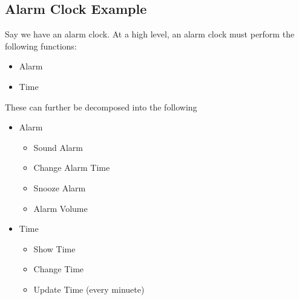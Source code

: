\documentclass[12pt,a4paper]{book}
\begin{document}
			\subsection{Alarm Clock Example}
				Say we have an alarm clock. At a high level, an alarm clock must perform the following functions:
				\begin{itemize}
					\item Alarm
					\item Time
				\end{itemize}

				These can further be decomposed into the following
				
				\begin{itemize}
					\item Alarm 
						\begin{itemize}
							\item Sound Alarm
							\item Change Alarm Time
							\item Snooze Alarm
							\item Alarm Volume
						\end{itemize}
					\item Time
						\begin{itemize}
							\item Show Time
							\item Change Time
							\item Update Time (every minuete)
						\end{itemize}
				\end{itemize}
\end{document}
